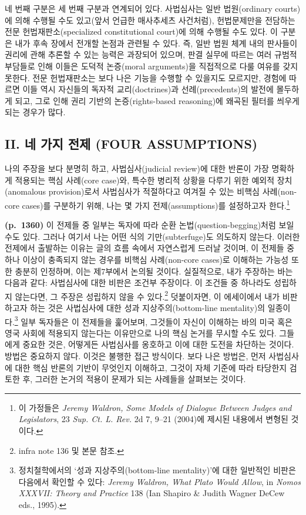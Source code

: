 \documentclass[a4paper,12pt,oneside]{article}  %
\begin{document}
네 번째 구분은 세 번째 구분과 연계되어 있다. 사법심사는 일반
법원(ordinary courts)에 의해 수행될 수도 있고(앞서 언급한 매사추세츠
사건처럼), 헌법문제만을 전담하는 전문 헌법재판소(specialized
constitutional court)에 의해 수행될 수도 있다. 이 구분은 내가 후속
장에서 전개할 논점과 관련될 수 있다. 즉, 일반 법원 체계 내의 판사들이
권리에 관해 추론할 수 있는 능력은 과장되어 있으며, 판결 실무에 따르는
여러 규범적 부담들로 인해 이들은 도덕적 논증(moral arguments)을
직접적으로 다룰 여유를 갖지 못한다. 전문 헌법재판소는 보다 나은 기능을
수행할 수 있을지도 모르지만, 경험에 따르면 이들 역시 자신들의 독자적
교리(doctrines)과 선례(precedents)의 발전에 몰두하게 되고, 그로 인해
권리 기반의 논증(rights-based reasoning)에 왜곡된 필터를 씌우게 되는
경우가 많다.

\subsection{II. 네 가지 전제 (FOUR
ASSUMPTIONS)}\label{ii.-uxb124-uxac00uxc9c0-uxc804uxc81c-four-assumptions}

나의 주장을 보다 분명히 하고, 사법심사(judicial review)에 대한 반론이
가장 명확하게 적용되는 핵심 사례(core case)와, 특수한 병리적 상황을
다루기 위한 예외적 장치(anomalous provision)로서 사법심사가 적절하다고
여겨질 수 있는 비핵심 사례(non-core cases)를 구분하기 위해, 나는 몇 가지
전제(assumptions)를 설정하고자 한다.\footnote{이 가정들은 \emph{Jeremy
  Waldron, Some Models of Dialogue Between Judges and Legislators}, 23
  \emph{Sup. Ct. L. Rev.} 2d 7, 9--21 (2004)에 제시된 내용에서 변형된
  것이다.}

\textbf{(p.~1360)} 이 전제들 중 일부는 독자에 따라 순환
논법(question-begging)처럼 보일 수도 있다. 그러나 여기서 나는 어떤 식의
기만(subterfuge)도 의도하지 않는다. 이러한 전제에서 출발하는 이유는 글의
흐름 속에서 자연스럽게 드러날 것이며, 이 전제들 중 하나 이상이 충족되지
않는 경우를 비핵심 사례(non-core cases)로 이해하는 가능성 또한 충분히
인정하며, 이는 제7부에서 논의될 것이다. 실질적으로, 내가 주장하는 바는
다음과 같다: 사법심사에 대한 비판은 조건부 주장이다. 이 조건들 중
하나라도 성립하지 않는다면, 그 주장은 성립하지 않을 수 있다.\footnote{infra
  note 136 및 본문 참조.} 덧붙이자면, 이 에세이에서 내가 비판하고자 하는
것은 사법심사에 대한 성과 지상주의(bottom-line mentality)의
일종이다.\footnote{정치철학에서의 `성과 지상주의(bottom-line
  mentality)'에 대한 일반적인 비판은 다음에서 확인할 수 있다:
  \emph{Jeremy Waldron, What Plato Would Allow}, in \emph{Nomos XXXVII:
  Theory and Practice} 138 (Ian Shapiro \& Judith Wagner DeCew eds.,
  1995).} 일부 독자들은 이 전제들을 훑어보며, 그것들이 자신이 이해하는
바의 미국 혹은 영국 사회에 적용되지 않는다는 이유만으로 나의 핵심 논거를
무시할 수도 있다. 그들에게 중요한 것은, 어떻게든 사법심사를 옹호하고
이에 대한 도전을 차단하는 것이다. 방법은 중요하지 않다. 이것은 불행한
접근 방식이다. 보다 나은 방법은, 먼저 사법심사에 대한 핵심 반론의 기반이
무엇인지 이해하고, 그것이 자체 기준에 따라 타당한지 검토한 후, 그러한
논거의 적용이 문제가 되는 사례들을 살펴보는 것이다.
\end{document}
